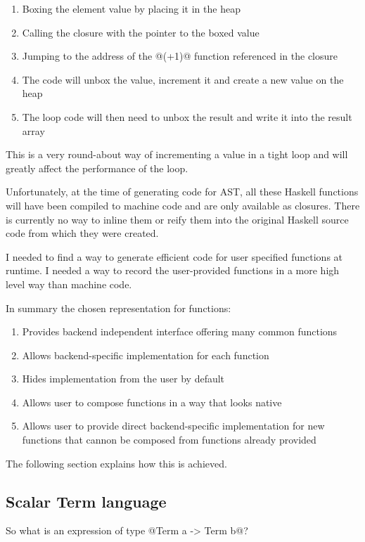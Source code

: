 \documentclass[preamble.tex]{subfiles}
\begin{document}
\begin{enumerate}
\item Boxing the element value by placing it in the heap
\item Calling the closure with the pointer to the boxed value
\item Jumping to the address of the @(+1)@ function referenced in the closure
\item The code will unbox the value, increment it and create a new value on the heap
\item The loop code will then need to unbox the result and write it into the result array
\end{enumerate}

This is a very round-about way of incrementing a value in a tight loop and will greatly affect the performance of the loop.

Unfortunately, at the time of generating code for AST, all these Haskell functions will have been compiled to machine code and are only available as closures. There is currently no way to inline them or reify them into the original Haskell source code from which they were created.

I needed to find a way to generate efficient code for user specified functions at runtime. I needed a way to record the user-provided functions in a more high level way than machine code.

In summary the chosen representation for functions:
\begin{enumerate}
\item Provides backend independent interface offering many common functions
\item Allows backend-specific implementation for each function
\item Hides implementation from the user by default
\item Allows user to compose functions in a way that looks native
\item Allows user to provide direct backend-specific implementation for new functions that cannon be composed from functions already provided
\end{enumerate}

The following section explains how this is achieved.

\subsection{Scalar Term language}

So what is an expression of type @Term a -> Term b@?
\end{document}
